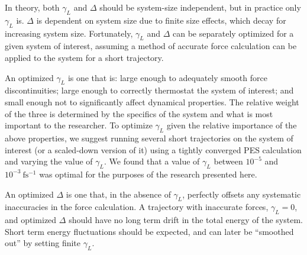 \documentclass[10pt,aps,prl,twocolumn,amsmath,amssymb,superscriptaddress,longbibliography]{revtex4-1}
\begin{document}
In theory, both $\gamma_L$ and $\Delta$ should be system-size independent, but in practice only $\gamma_L$ is.
$\Delta$ is dependent on system size due to finite size effects, which decay for increasing system size.
Fortunately, $\gamma_L$ and $\Delta$ can be separately optimized for a given system of interest, assuming a method of accurate force calculation can be applied to the system for a short trajectory. 

An optimized $\gamma_L$ is one that is: large enough to adequately smooth force discontinuities; large enough to correctly thermostat the system of interest; and small enough not to significantly affect dynamical properties. 
The relative weight of the three is determined by the specifics of the system and what is most important to the researcher. 
To optimize $\gamma_L$ given the relative importance of the above properties, we suggest running several short trajectories on the system of interest (or a scaled-down version of it) using a tightly converged PES calculation and varying the value of $\gamma_L$. 
We found that a value of $\gamma_L$ between $10^{-5}$ and $10^{-3}\ \mathrm{fs^{-1}}$ was optimal for the purposes of the research presented here.

An optimized $\Delta$ is one that, in the absence of $\gamma_L$, perfectly offsets any systematic inaccuracies in the force calculation. 
A trajectory with inaccurate forces, \mbox{$\gamma_L = 0$}, and optimized $\Delta$ should have no long term drift in the total energy of the system. Short term energy fluctuations should be expected, and can later be ``smoothed out'' by setting finite $\gamma_L$.
\end{document}
